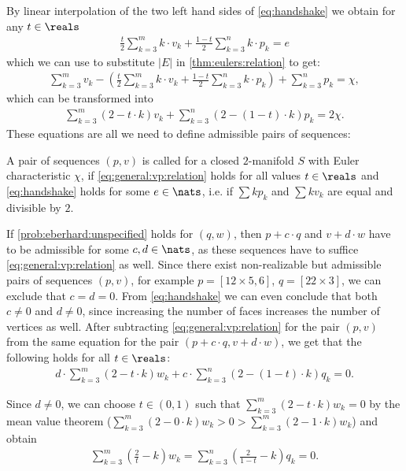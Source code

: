 By linear interpolation of the two left hand sides of \eqref{eq:handshake} we obtain for any $t \in \reals$
\begin{align}
  \frac{t}{2} \sum_{k=3}^m k \cdot v_k + \frac{1-t}{2} \sum_{k=3}^n k \cdot p_k = e \label{eq:interpolated:handshake}
\end{align}
 which we can use to substitute $|E|$ in \autoref{thm:eulers:relation} to get:
\begin{align*}
  \sum_{k=3}^m v_k - \left(\frac{t}{2} \sum_{k=3}^m k \cdot v_k + \frac{1-t}{2} \sum_{k=3}^n k \cdot p_k \right) + \sum_{k=3}^n p_k = \chi,
\end{align*}
which can be transformed into
\begin{align}
  \sum_{k=3}^m (2 - t \cdot k ) v_k + \sum_{k=3}^n ( 2 - (1 - t) \cdot k ) p_k = 2 \chi. \label{eq:general:vp:relation}
\end{align}
These equations are all we need to define admissible pairs of sequences:
\begin{definition} A pair of sequences $(p, v)$ is called  for a closed $2$-manifold $S$ with {\sc Euler} characteristic $\chi$, if \eqref{eq:general:vp:relation} holds for all values $t \in \reals$ and \eqref{eq:handshake} holds for some $e \in \nats$, i.e. if $\sum k p_k$ and $\sum k v_k$ are equal and divisible by $2$.
\end{definition}

If \autoref{prob:eberhard:unspecified} holds for $(q, w)$, then $p + c \cdot q$ and $v + d \cdot w$ have to be admissible for some $c,d \in \nats$, as these sequences have to suffice \eqref{eq:general:vp:relation} as well. Since there exist non-realizable but admissible pairs of sequences $(p, v)$, for example $p = [12 \times 5, 6]$, $q = [22 \times 3]$, we can exclude that $c = d = 0$. From \eqref{eq:handshake} we can even conclude that both $c \neq 0$ and $d \neq 0$, since increasing the number of faces increases the number of vertices as well. After subtracting \eqref{eq:general:vp:relation} for the pair $(p, v)$ from the same equation for the pair $(p + c \cdot q, v + d \cdot w)$, we get that the following holds for all $t \in \reals$:
\begin{align*}
  d \cdot \sum_{k=3}^m \left(2 - t \cdot k \right) w_k + c \cdot \sum_{k=3}^n \left( 2 - (1 - t) \cdot k \right) q_k = 0. 
\end{align*}

Since $d \neq 0$, we can choose $t \in (0, 1)$ such that $\sum_{k=3}^m (2 - t \cdot k) w_k = 0$ by the mean value theorem ($\sum_{k=3}^m (2 - 0 \cdot k) w_k > 0 > \sum_{k=3}^m (2 - 1 \cdot k) w_k$) and obtain
\begin{align}
    \sum_{k=3}^m \left(\frac{2}{t} - k \right) w_k = \sum_{k=3}^n \left( \frac{2}{1-t} - k \right) q_k = 0. \label{eq:qw:flat}
\end{align}

